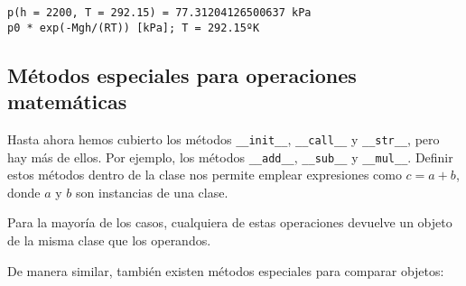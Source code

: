 \begin{Verbatim}[commandchars=\\\{\}]
p(h = 2200, T = 292.15) = 77.31204126500637 kPa
p0 * exp(-Mgh/(RT)) [kPa]; T = 292.15ºK
\end{Verbatim}

\subsection{Métodos especiales para operaciones matemáticas}

Hasta ahora hemos cubierto los métodos \texttt{\_\_init\_\_},
\texttt{\_\_call\_\_} y \texttt{\_\_str\_\_}, pero hay más de ellos. Por
ejemplo, los métodos \texttt{\_\_add\_\_}, \texttt{\_\_sub\_\_} y
\texttt{\_\_mul\_\_}. Definir estos métodos dentro de la clase nos
permite emplear expresiones como \(c = a + b\), donde \(a\) y \(b\) son
instancias de una clase.

\begin{Shaded}
\begin{Highlighting}[]
\OperatorTok{=}\OperatorTok{+}

\OperatorTok{=}\OperatorTok{{-}}

\OperatorTok{=}\OperatorTok{*}

\OperatorTok{=}\OperatorTok{/}

\OperatorTok{=}\OperatorTok{**}
\end{Highlighting}
\end{Shaded}

Para la mayoría de los casos, cualquiera de estas operaciones devuelve
un objeto de la misma clase que los operandos.

De manera similar, también existen métodos especiales para comparar
objetos:

\begin{Shaded}
\begin{Highlighting}[]
\OperatorTok{==}

\OperatorTok{!=}

\OperatorTok{\textless{}}

\OperatorTok{\textless{}=}

\OperatorTok{\textgreater{}}

\OperatorTok{\textgreater{}=}
\end{Highlighting}
\end{Shaded}

